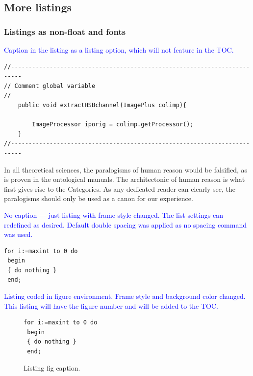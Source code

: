 \documentclass[phd,showgrids]{ndsu-thesis-2022}
\newcommand\italk[1]{\textcolor{blue}{#1}}  %
\begin{document}
\subsection{More listings}

\subsubsection{Listings as non-float and fonts}

\italk{Caption in the listing as a listing option, which will not feature in the TOC.}

{\singlespacing
\begin{lstlisting}[frameround=fttt, caption = {Caption in listing as option.}, captionpos=b]
//-------------------------------------------------------------------------
// Comment global variable
//
	public void extractHSBchannel(ImagePlus colimp){

		ImageProcessor iporig = colimp.getProcessor();
	}	
//-------------------------------------------------------------------------	
\end{lstlisting}
}

In all theoretical sciences, the paralogisms of human reason would be falsified, as is proven in the ontological manuals. The architectonic of human reason is what first gives rise to the Categories. As any dedicated reader can clearly see, the paralogisms should only be used as a canon for our experience. 

\italk{No caption --- just listing with frame style changed. The list settings can redefined as desired. Default double spacing was applied as no spacing command was used.}
\vspace{3mm}

\lstset{frameround=fttt}
\begin{lstlisting}[frame=trBL, caption={}]
 for i:=maxint to 0 do
 begin
 { do nothing }
 end;
\end{lstlisting}

\kant[9]
\italk{Listing coded in figure environment. Frame style and background color changed. This listing will have the figure number and will be added to the TOC.}

\begin{figure}[h!]
{\singlespacing
\lstset{frameround=fttt}
\begin{lstlisting}[frame=trBL, backgroundcolor=\color{blue!10!white}]
 for i:=maxint to 0 do
 begin
 { do nothing }
 end;
\end{lstlisting}
}
\caption{Listing fig caption.}
\end{figure}
\end{document}
